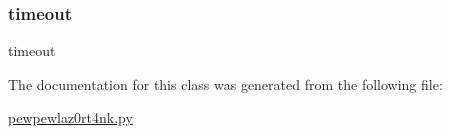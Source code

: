 \mbox{\label{classpewpewlaz0rt4nk_1_1_beam_aee145bfca8e9b2eaf3cd3c47157be9a3}} 
\subsubsection{\texorpdfstring{timeout}{timeout}}
{\footnotesize\ttfamily timeout}



The documentation for this class was generated from the following file\+:\begin{DoxyCompactItemize}
\item 
\hyperlink{pewpewlaz0rt4nk_8py}{pewpewlaz0rt4nk.\+py}\end{DoxyCompactItemize}
